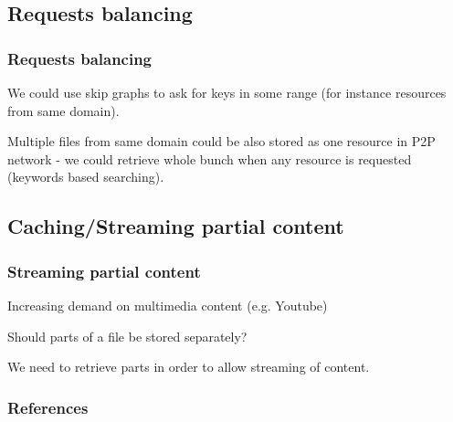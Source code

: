 \documentclass{beamer}
\begin{document}
\subsection{Requests balancing}
\begin{frame}
\frametitle{Requests balancing}

\begin{block}{}
We could use skip graphs \cite{aspnes2007skip} to ask for keys in some range 
(for instance resources from same domain). 
\end{block}

\begin{block}{}
Multiple files from same domain could be also stored as one resource
in P2P network - we could retrieve whole bunch when any resource is requested
(keywords based searching).
\end{block}

\end{frame}

\subsection{Caching/Streaming partial content}

\begin{frame}
\frametitle{Streaming partial content}
\begin{block}{}
Increasing demand on multimedia content (e.g. Youtube)
\end{block}

\begin{block}{}
Should parts of a file be stored separately?
\end{block}

\begin{block}{}
We need to retrieve parts in order to allow streaming of content.
\end{block}

\end{frame}

\begin{frame}[allowframebreaks]
\frametitle{References}


\end{frame}
\end{document}
